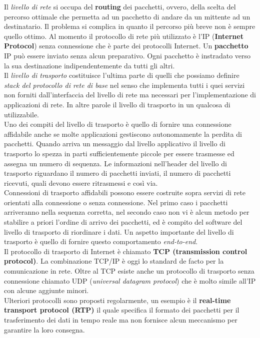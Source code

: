 Il \emph{livello di rete} si occupa del \textbf{routing} dei pacchetti, ovvero, della scelta del percorso ottimale che permetta ad un pacchetto di andare da un mittente ad un destinatario.
Il problema si complica in quanto il percorso più breve non è sempre quello ottimo. Al momento il protocollo di rete più utilizzato è l'IP (\textbf{Internet Protocol}) senza connessione che è parte dei protocolli Internet. Un \textbf{pacchetto} IP può essere inviato senza alcun preparativo. Ogni pacchetto è instradato verso la sua destinazione indipendentemente da tutti gli altri.\\
Il \emph{livello di trasporto} costituisce l'ultima parte di quelli che possiamo definire \emph{stack del protocollo di rete di base} nel senso che implementa tutti i quei servizi non forniti dall'interfaccia del livello di rete ma necessari per l'implementazione di applicazioni di rete. In altre parole il livello di trasporto in un qualcosa di utilizzabile.\\
Uno dei compiti del livello di trasporto è quello di fornire una connessione affidabile anche se molte applicazioni gestiscono autonomamente la perdita di pacchetti.
Quando arriva un messaggio dal livello applicativo il livello di trasporto lo spezza in parti sufficientemente piccole per essere trasmesse ed assegna un numero di sequenza. Le informazioni nell'header del livello di trasporto riguardano il numero di pacchetti inviati, il numero di pacchetti ricevuti, quali devono essere ritrasmessi e così via.\\
Connessioni di trasporto affidabili possono essere costruite sopra servizi di rete orientati alla connessione o senza connessione. Nel primo caso i pacchetti arriveranno nella sequenza corretta, nel secondo caso non vi è alcun metodo per stabilire a priori l'ordine di arrivo dei pacchetti, ed è compito del software del livello di trasporto di riordinare i dati. Un aspetto importante del livello di trasporto è quello di fornire questo comportamento \emph{end-to-end}.\\
Il protocollo di trasporto di Internet è chiamato \textbf{TCP (transmission control protocol)}. La combinazione TCP/IP è oggi lo standard de facto per la comunicazione in rete. Oltre al TCP esiste anche un protocollo di trasporto senza connessione chiamato UDP (\emph{universal datagram protocol}) che è molto simile all'IP con alcune aggiunte minori.\\
Ulteriori protocolli sono proposti regolarmente, un esempio è il \textbf{real-time transport protocol (RTP)} il quale specifica il formato dei pacchetti per il trasferimento dei  dati in tempo reale ma non fornisce alcun meccanismo per garantire la loro consegna.\\
